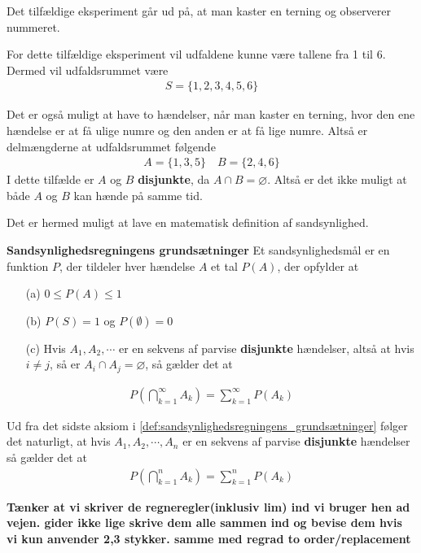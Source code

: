 \begin{eks} \textbf{} %
\newline
Det tilfældige eksperiment går ud på, at man kaster en terning og observerer nummeret.

For dette tilfældige eksperiment vil udfaldene kunne være tallene fra 1 til 6. Dermed vil udfaldsrummet være
\begin{align*}
    S = \{1, 2, 3, 4, 5, 6\}
\end{align*}

Det er også muligt at have to hændelser, når man kaster en terning, hvor den ene hændelse er at få ulige numre og den anden er at få lige numre. Altså er delmængderne at udfaldsrummet følgende
\begin{align*}
    A = \{1, 3, 5\} \quad B = \{2, 4, 6\}
\end{align*}
I dette tilfælde er $A$ og $B$  \textbf{disjunkte}, da $A \cap B = \varnothing$. Altså er det ikke muligt at både $A$ og $B$ kan hænde på samme tid.
\end{eks}

Det er hermed muligt at lave en matematisk definition af sandsynlighed.

\begin{defn}\textbf{Sandsynlighedsregningens grundsætninger} \label{def:sandsynlighedsregningens_grundsætninger}%
\newline
Et sandsynlighedsmål er en funktion $P$, 
der tildeler hver hændelse $A$ et tal $P(A)$, der opfylder at
\begin{enumerate}
    \item[(a)] $0 \leq P(A) \leq 1$
    \item[(b)]$P(S) = 1$ og $P(\emptyset)=0$
    \item[(c)] Hvis $A_1, A_2, \cdots$ er en sekvens af parvise \textbf{disjunkte} hændelser, altså at hvis $i \neq j$, så er $A_i \cap A_j = \varnothing$, så gælder det at
\end{enumerate}
\begin{align*}
    P\left(\bigcap_{k=1}^\infty A_k \right) = \sum_{k=1}^\infty P(A_k)
\end{align*}
\end{defn}

Ud fra det sidste aksiom i \autoref{def:sandsynlighedsregningens_grundsætninger} følger det naturligt, at hvis $A_1, A_2, \cdots , A_n$ er en sekvens af parvise \textbf{disjunkte} hændelser så gælder det at
\begin{align*}
    P\left(\bigcap_{k=1}^n A_k \right) = \sum_{k=1}^n P(A_k)
\end{align*}

\textbf{Tænker at vi skriver de regneregler(inklusiv lim) ind vi bruger hen ad vejen. gider ikke lige skrive dem alle sammen ind og bevise dem hvis vi kun anvender 2,3 stykker. samme med regrad to order/replacement}














